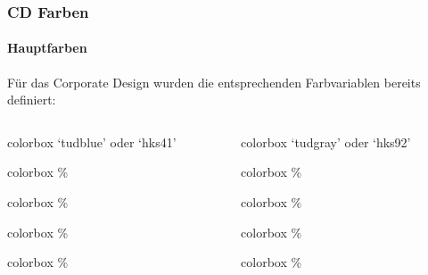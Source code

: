\documentclass[german,notoc,draft]{tudbeamer}%
\begin{document}
\begin{frame}
	\frametitle{CD Farben}
	\framesubtitle{Hauptfarben}
	Für das Corporate Design wurden die entsprechenden Farbvariablen bereits definiert:
	\begin{columns}[t]
		\begin{column}{.4\textwidth}%
			\begin{beamercolorbox}[wd=0.9\textwidth,sep=1em]{colorbox}
				\centering `tudblue' oder `hks41'
		    \end{beamercolorbox}
			\begin{beamercolorbox}[wd=0.9\textwidth,sep=1em]{colorbox}
				\%
		    \end{beamercolorbox}
			\begin{beamercolorbox}[wd=0.9\textwidth,sep=1em]{colorbox}
				\%
		    \end{beamercolorbox}
			\begin{beamercolorbox}[wd=0.9\textwidth,sep=1em]{colorbox}
				\%
		    \end{beamercolorbox}
			\begin{beamercolorbox}[wd=0.9\textwidth,sep=1em]{colorbox}
				\%
		    \end{beamercolorbox}
		\end{column}

		\begin{column}{.4\textwidth}%
			\begin{beamercolorbox}[wd=0.9\textwidth,sep=1em]{colorbox}
				\centering `tudgray' oder `hks92'
		    \end{beamercolorbox}
			\begin{beamercolorbox}[wd=0.9\textwidth,sep=1em]{colorbox}
				\%
		    \end{beamercolorbox}
			\begin{beamercolorbox}[wd=0.9\textwidth,sep=1em]{colorbox}
				\%
		    \end{beamercolorbox}
			\begin{beamercolorbox}[wd=0.9\textwidth,sep=1em]{colorbox}
				\%
		    \end{beamercolorbox}
			\begin{beamercolorbox}[wd=0.9\textwidth,sep=1em]{colorbox}
				\%
		    \end{beamercolorbox}
		\end{column}
	\end{columns}
\end{frame}
\end{document}
